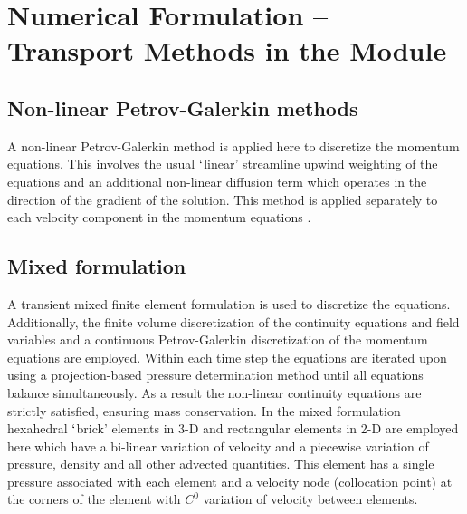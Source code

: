 \section{Numerical Formulation -- Transport Methods in the \fluidity Module}%
\label{fluid_transport_methods_section}

\subsection{Non-linear Petrov-Galerkin methods}

A non-linear Petrov-Galerkin method is applied here to discretize the momentum equations. This involves the usual $\lq$linear' streamline upwind weighting of the equations and an additional non-linear diffusion term which operates in the direction of the gradient of the solution. This method is applied separately to each velocity component in the momentum equations \citep[see][for further details]{pain_2001b,hughes_1986}.

\subsection{Mixed formulation}
A transient mixed finite element formulation is used to discretize the equations. Additionally, the finite volume discretization of the continuity equations and field variables and a continuous Petrov-Galerkin \citep{claes_1987} discretization of the momentum equations are employed. Within each time step the equations are iterated upon using a projection-based pressure determination method until all equations balance simultaneously. As a result the non-linear continuity equations are strictly satisfied, ensuring mass conservation. In the mixed formulation hexahedral $\lq$brick' elements in 3-D and rectangular elements in 2-D are employed here which have a bi-linear variation of velocity and a piecewise variation of pressure, density and all other advected quantities. This element has a single pressure associated with each element and a velocity node (collocation point) at the corners of the element with $C^0$ variation of velocity between elements.
\medskip

